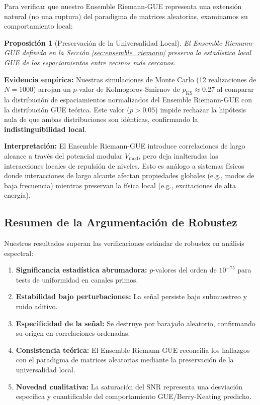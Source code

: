 \documentclass[12pt, a4paper]{article}
\theoremstyle{plain}
\newtheorem{proposicion}[teorema]{Proposición}
\theoremstyle{definition}
\theoremstyle{remark}
\begin{document}
Para verificar que nuestro Ensemble Riemann-GUE representa una extensión natural (no una ruptura) del paradigma de matrices aleatorias, examinamos su comportamiento local:

\begin{proposicion}[Preservación de la Universalidad Local]
El Ensemble Riemann-GUE definido en la Sección \ref{sec:ensemble_riemann} preserva la estadística local GUE de los espaciamientos entre vecinos más cercanos.
\end{proposicion}

\textbf{Evidencia empírica:} Nuestras simulaciones de Monte Carlo (12 realizaciones de $N=1000$) arrojan un $p$-valor de Kolmogorov-Smirnov de $p_{\text{KS}} \approx 0.27$ al comparar la distribución de espaciamientos normalizados del Ensemble Riemann-GUE con la distribución GUE teórica. Este valor ($p > 0.05$) impide rechazar la hipótesis nula de que ambas distribuciones son idénticas, confirmando la \textbf{indistinguibilidad local}.

\textbf{Interpretación:} El Ensemble Riemann-GUE introduce correlaciones de largo alcance a través del potencial modular $V_{\text{mod}}$, pero deja inalteradas las interacciones locales de repulsión de niveles. Esto es análogo a sistemas físicos donde interacciones de largo alcante afectan propiedades globales (e.g., modos de baja frecuencia) mientras preservan la física local (e.g., excitaciones de alta energía).

\subsection{Resumen de la Argumentación de Robustez}
\label{subsec:resumen_robustez}

Nuestros resultados superan las verificaciones estándar de robustez en análisis espectral:

\begin{enumerate}[label=\arabic*., leftmargin=*, align=left]
    \item \textbf{Significancia estadística abrumadora:} $p$-valores del orden de $10^{-75}$ para tests de uniformidad en canales primos.
    
    \item \textbf{Estabilidad bajo perturbaciones:} La señal persiste bajo submuestreo y ruido aditivo.
    
    \item \textbf{Especificidad de la señal:} Se destruye por barajado aleatorio, confirmando su origen en correlaciones ordenadas.
    
    \item \textbf{Consistencia teórica:} El Ensemble Riemann-GUE reconcilia los hallazgos con el paradigma de matrices aleatorias mediante la preservación de la universalidad local.
    
    \item \textbf{Novedad cualitativa:} La saturación del SNR representa una desviación específica y cuantificable del comportamiento GUE/Berry-Keating predicho.
\end{enumerate}
\end{document}
